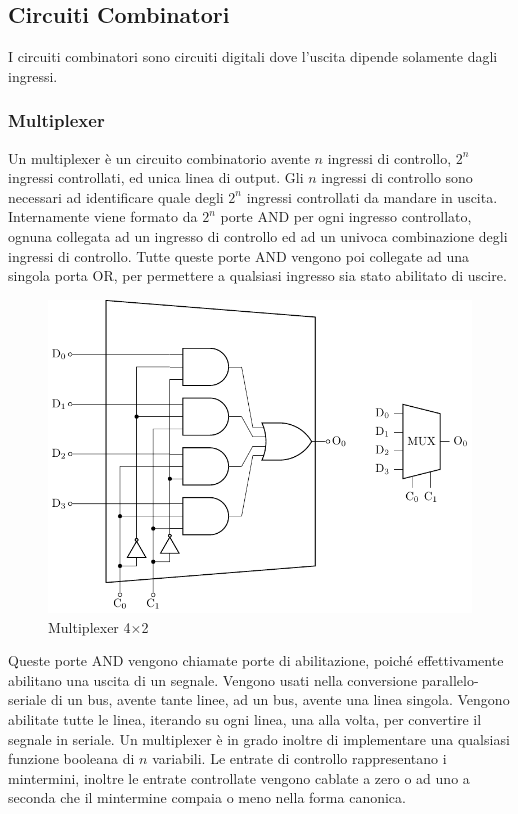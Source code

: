 \documentclass{article}
\numberwithin{equation}{subsection}
\begin{document}
\subsection{Circuiti Combinatori}

I circuiti combinatori sono circuiti digitali dove l'uscita dipende solamente dagli ingressi. 

\subsubsection{Multiplexer}

Un multiplexer è un circuito combinatorio avente $n$ ingressi di controllo, $2^n$ ingressi controllati, ed unica linea di output. Gli $n$ ingressi di controllo sono necessari ad identificare quale degli $2^n$ 
ingressi controllati da mandare in uscita. Internamente viene formato da $2^n$ porte AND per ogni ingresso controllato, ognuna collegata ad un ingresso di controllo ed ad un univoca combinazione degli 
ingressi di controllo. Tutte queste porte AND vengono poi collegate ad una singola porta OR, per permettere a qualsiasi ingresso sia stato abilitato di uscire. 

\begin{figure}[H]%
    \centering%
    \includegraphics{multiplexer-2x4.pdf}%
    \caption{Multiplexer 4$\times$2}%
\end{figure}

Queste porte AND vengono chiamate porte di abilitazione, poiché effettivamente abilitano una uscita di un segnale. Vengono usati nella conversione parallelo-seriale di un bus, avente tante linee, ad un bus, avente 
una linea singola. Vengono abilitate tutte le linea, iterando su ogni linea, una alla volta, per convertire il segnale in seriale. Un multiplexer è in grado inoltre di implementare una qualsiasi funzione 
booleana di $n$ variabili. Le entrate di controllo rappresentano i mintermini, inoltre le entrate controllate vengono cablate a zero o ad uno a seconda che il mintermine compaia o meno nella forma canonica. 
\end{document}

